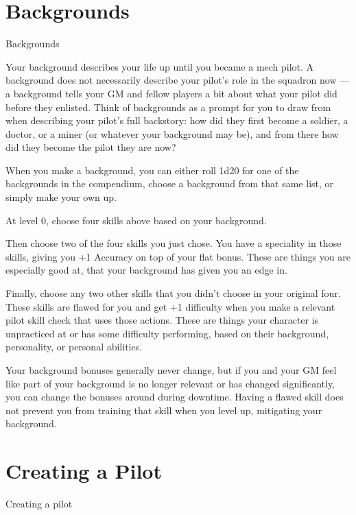 \chapter{Backgrounds}
                                               Backgrounds  

Your background describes your life up until you became a mech pilot. A background does not  
necessarily describe your pilot’s role in the squadron now — a background tells your GM and  
fellow players a bit about what your pilot did before they enlisted. Think of backgrounds as a  
prompt for you to draw from when describing your pilot’s full backstory: how did they first  
become a soldier, a doctor, or a miner (or whatever your background may be), and from there  
how did they become the pilot they are now? 
 

When you make a background, you can either roll 1d20 for one of the backgrounds in the  
compendium, choose a background from that same list, or simply make your own up.
 

At level 0, choose four skills above based on your background. 
 
Then choose two of the four skills you just chose. You have a speciality in those skills, giving  
you +1 Accuracy on top of your flat bonus. These are things you are especially good at, that  
your background has given you an edge in.
 

                                                                                                                 


Finally, choose any two other skills that you didn’t choose in your original four. These skills are  
flawed for you and get +1 difficulty when you make a relevant pilot skill check that uses those  
actions. These are things your character is unpracticed at or has some difficulty performing,  
based on their background, personality, or personal abilities.
 

Your background bonuses generally never change, but if you and your GM feel like part of your  
background is no longer relevant or has changed significantly, you can change the bonuses  
around during downtime. Having a flawed skill does not prevent you from training that skill when  
you level up, mitigating your background.
 
\chapter{Creating a Pilot}
                                              Creating a pilot  

